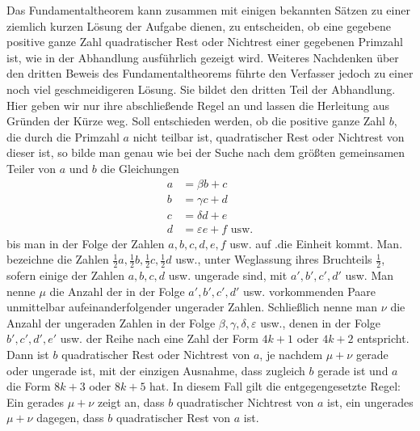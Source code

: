 \clearpage{}%
Das Fundamentaltheorem kann zusammen mit einigen bekannten Sätzen zu einer ziemlich kurzen Lösung der Aufgabe dienen, zu entscheiden, ob eine gegebene positive ganze Zahl quadratischer Rest oder Nichtrest einer gegebenen Primzahl ist, wie in der Abhandlung ausführlich gezeigt wird. Weiteres Nachdenken über den dritten Beweis des Fundamentaltheorems führte den Verfasser jedoch zu einer noch viel geschmeidigeren Lösung. Sie bildet den dritten Teil der Abhandlung. Hier geben wir nur ihre abschließende Regel an und lassen die Herleitung aus Gründen der Kürze weg. Soll entschieden werden, ob die positive ganze Zahl $b$, die durch die Primzahl $a$ nicht teilbar ist, quadratischer Rest oder Nichtrest von dieser ist, so bilde man genau wie bei der Suche nach dem größten gemeinsamen Teiler von $a$ und $b$ die Gleichungen
\[
\begin{aligned}
a&=\beta b+c\\
b&=\gamma c+d\\
c&=\delta d+e\\
d&=\varepsilon e+f\text{ usw.}
\end{aligned}
\]
bis man in der Folge der Zahlen $a,b,c,d,e,f$ usw. auf .die Einheit kommt. Man. bezeichne die Zahlen $\frac12a,\frac12b,\frac12c,\frac12d$ usw., unter Weglassung ihres Bruchteils $\frac12$, sofern einige der Zahlen $a,b,c,d$ usw. ungerade sind, mit $a',b',c',d'$ usw. Man nenne $\mu$ die Anzahl der in der Folge $a',b',c',d'$ usw. vorkommenden Paare unmittelbar aufeinanderfolgender ungerader Zahlen. Schließlich nenne man $\nu$ die Anzahl der ungeraden Zahlen in der Folge $\beta,\gamma,\delta,\varepsilon$ usw., denen in der Folge $b',c',d',e'$ usw. der Reihe nach eine Zahl der Form $4k+1$ oder $4k+2$ entspricht. Dann ist $b$ quadratischer Rest oder Nichtrest von $a$, je nachdem $\mu+\nu$ gerade oder ungerade ist, mit der einzigen Ausnahme, dass zugleich $b$ gerade ist und $a$ die Form $8k+3$ oder $8k+5$ hat. In diesem Fall gilt die entgegengesetzte Regel: Ein gerades $\mu+\nu$ zeigt an, dass $b$ quadratischer Nichtrest von $a$ ist, ein ungerades $\mu+\nu$ dagegen, dass $b$ quadratischer Rest von $a$ ist.
